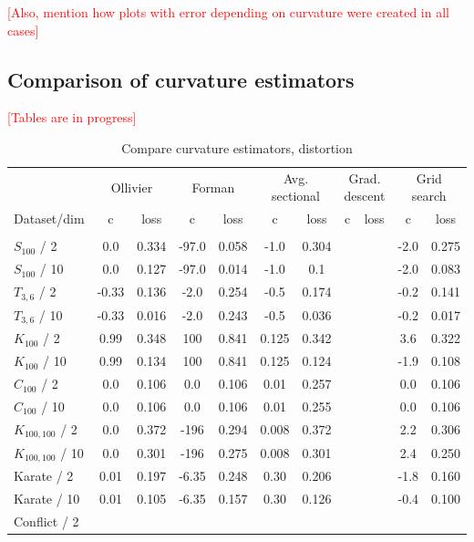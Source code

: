 \documentclass{article} %
\begin{document}
\textcolor{red}{[Also, mention how plots with error depending on curvature were created in all cases]}

\subsection{Comparison of curvature estimators}

\textcolor{red}{[Tables are in progress]}

\begin{table}[t]
\caption{Compare curvature estimators, distortion}
\label{tab:compare_distortion}
\begin{center}
\begin{tabular}{lcccccccccc}
&
\multicolumn{2}{c}{Ollivier} &
\multicolumn{2}{c}{Forman} &
\multicolumn{2}{c}{Avg. sectional} &
\multicolumn{2}{c}{Grad. descent} &
\multicolumn{2}{c}{Grid search} \\
Dataset/dim & c & loss  & c & loss  & c & loss  & c & loss  & c & loss \\
 \hline \\
$S_{100}$ / 2 &
0.0 & 0.334 & 
-97.0 & 0.058 & 
-1.0 & 0.304 &
&&
-2.0 & 0.275 \\
$S_{100}$ / 10 &
0.0 & 0.127 & 
-97.0 & 0.014 & 
-1.0 & 0.1 & 
&&
-2.0 & 0.083\\
$T_{3,6}$ / 2 &
-0.33 & 0.136 & 
-2.0 & 0.254 & 
-0.5 & 0.174 & 
&&
-0.2 & 0.141 \\
$T_{3,6}$ / 10 &
-0.33 & 0.016 & 
-2.0 & 0.243 & 
-0.5 & 0.036 & 
&&
-0.2 & 0.017 \\
$K_{100}$ / 2 & 
0.99 & 0.348 & 
100 & 0.841 & 
0.125 & 0.342 & 
&&
3.6 & 0.322 \\
$K_{100}$ / 10 & 
0.99 & 0.134 & 
100 & 0.841 & 
0.125 & 0.124 & 
&&
-1.9 & 0.108 \\
$C_{100}$ / 2 & 
0.0 & 0.106 & 
0.0 & 0.106 & 
0.01 & 0.257 &
&&
0.0 & 0.106 \\
$C_{100}$ / 10 & 
0.0 & 0.106 & 
0.0 & 0.106 & 
0.01 & 0.255 & 
&&
0.0 & 0.106 \\
$K_{100,100}$ / 2 &
0.0 & 0.372 & 
-196 & 0.294 & 
0.008 & 0.372 & 
&&
2.2 & 0.306 \\
$K_{100,100}$ / 10 &
0.0 & 0.301 & 
-196 & 0.275 & 
0.008 & 0.301 & 
&&
2.4 & 0.250 \\
Karate / 2 &
0.01 & 0.197 & 
-6.35 & 0.248 &
0.30 & 0.206 &
&&
-1.8 & 0.160 \\
Karate / 10 &
0.01 & 0.105 & 
-6.35 & 0.157 &
0.30 & 0.126 &
&&
-0.4 & 0.100 \\
Conflict / 2 &

\end{tabular}
\end{center}
\end{table}
\end{document}
